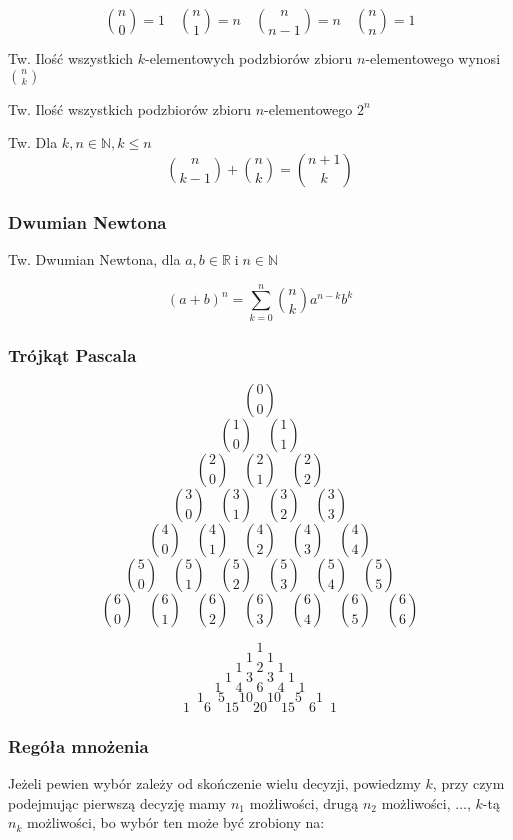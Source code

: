\documentclass[../Matematyka.tex]{subfiles}
\begin{document}
    \begin{displaymath}
        \binom{n}{0} = 1 \quad
        \binom{n}{1} = n \quad
        \binom{n}{n - 1} = n \quad
        \binom{n}{n} = 1
    \end{displaymath}

    Tw. Ilość wszystkich \(k\)-elementowych podzbiorów zbioru \(n\)-elementowego wynosi \(\binom{n}{k}\)\par
    Tw. Ilość wszystkich podzbiorów zbioru \(n\)-elementowego \(2^n\)\par
    Tw. Dla \(k, n \in \mathbb{N}, k \leq n\)
    \begin{displaymath}
        \binom{n}{k-1}+
        \binom{n}{k} = 
        \binom{n+1}{k}
    \end{displaymath}

    \subsubsection*{Dwumian Newtona}
    Tw. Dwumian Newtona, dla  \(a, b \in \mathbb{R} \;\text{i}\; n \in \mathbb{N}\)

    \[(a+b)^n = \sum^{n}_{k=0} \binom{n}{k}a^{n-k}b^k\]

    \subsubsection*{Trójkąt Pascala}

    \[\binom{0}{0}\]
    \[\binom{1}{0}\quad\binom{1}{1}\]
    \[\binom{2}{0}\quad\binom{2}{1}\quad\binom{2}{2}\]
    \[\binom{3}{0}\quad\binom{3}{1}\quad\binom{3}{2}\quad\binom{3}{3}\]
    \[\binom{4}{0}\quad\binom{4}{1}\quad\binom{4}{2}\quad\binom{4}{3}\quad\binom{4}{4}\]
    \[\binom{5}{0}\quad\binom{5}{1}\quad\binom{5}{2}\quad\binom{5}{3}\quad\binom{5}{4}\quad\binom{5}{5}\]
    \[\binom{6}{0}\quad\binom{6}{1}\quad\binom{6}{2}\quad\binom{6}{3}\quad\binom{6}{4}\quad\binom{6}{5}\quad\binom{6}{6}\]

    \[1\]
    \[1\quad1\]
    \[1\quad2\quad1\]
    \[1\quad3\quad3\quad1\]
    \[1\quad4\quad6\quad4\quad1\]
    \[1\quad5\quad10\quad10\quad5\quad1\]
    \[1\quad6\quad15\quad20\quad15\quad6\quad1\]

    \subsubsection{Regóła mnożenia}
    Jeżeli pewien wybór zależy od skończenie wielu decyzji, powiedzmy \(k\), 
    przy czym podejmując pierwszą decyzję mamy \(n_1\) możliwości, drugą \(n_2\) możliwości, 
    \(\ldots\), \(k\)-tą \(n_k\) możliwości, bo wybór ten może być zrobiony na:
\end{document}
